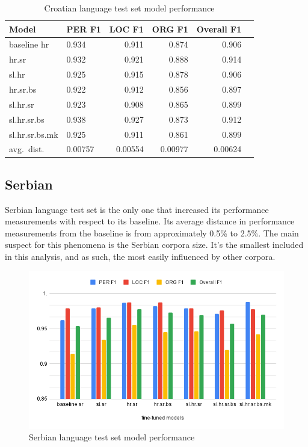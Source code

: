 \documentclass[sigconf]{acmart}
\begin{document}
\begin{table}[H]
  \caption{Croatian language test set model performance}
  \label{tab:eval_hr}
  \begin{tabular}{llrrrr}
    \toprule
    Model&PER F1&LOC F1&ORG F1&Overall F1\\
    \midrule
    baseline hr&0.934&0.911&0.874&0.906\\
    \midrule
    hr.sr&0.932&0.921&0.888&0.914\\
    sl.hr&0.925&0.915&0.878&0.906\\
    hr.sr.bs&0.922&0.912&0.856&0.897\\
    sl.hr.sr&0.923&0.908&0.865&0.899\\
    sl.hr.sr.bs&0.938&0.927&0.873&0.912\\
    sl.hr.sr.bs.mk&0.925&0.911&0.861&0.899\\
    \midrule
    avg.\ dist.&0.00757&0.00554&0.00977&0.00624\\
    \bottomrule
  \end{tabular}
\end{table}

\subsection{Serbian}
\label{subsec:serbian}
Serbian language test set is the only one that increased its performance measurements with respect to its baseline.
Its average distance in performance measurements from the baseline is from approximately 0.5\% to 2.5\%.
The main suspect for this phenomena is the Serbian corpora size.
It's the smallest included in this analysis, and as such, the most easily influenced by other corpora.
\begin{figure}[h]
  \caption{Serbian language test set model performance}
  \label{fig:eval_sr}
  \centering
  \includegraphics[width=\linewidth]{eval_sr}
\end{figure}
\end{document}
